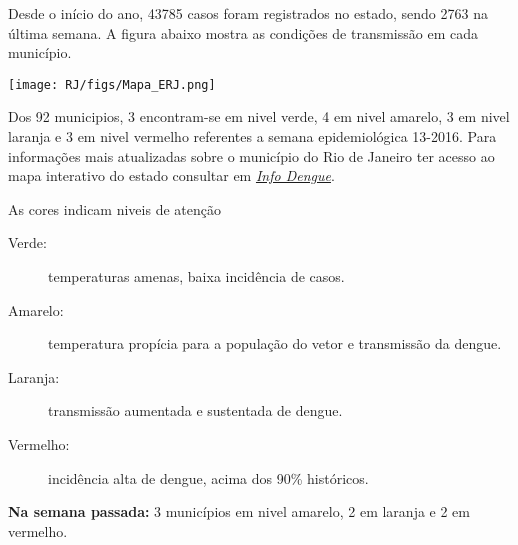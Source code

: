 \documentclass[10pt]{article} %
\begin{document}
\begin{minipage}[t]{.66\linewidth} %

\hypertarget{estado}{} %

Desde o início do ano, 43785 casos foram registrados no estado, sendo 2763 na última semana. A figura abaixo mostra as condições de transmissão em cada município.

\texttt{[image: RJ/figs/Mapa\_ERJ.png]}

Dos 92 municipios, 3 encontram-se em nivel verde, 4 em nivel amarelo, 3 em nivel laranja e 3 em nivel vermelho referentes a semana epidemiológica 13-2016. Para informações mais atualizadas
sobre o município do Rio de Janeiro ter acesso ao mapa interativo do estado consultar em \href{http://info.dengue.mat.br}{\textit{Info Dengue}}.


\vspace{1cm}
\begin{mdframed}[style=intextbox,frametitle={}] %

\hypertarget{descriptivebox}{} %
As cores indicam niveis de atenção
\begin{description}
\item[Verde:] temperaturas amenas, baixa incidência de casos.      
\item[Amarelo:] temperatura propícia para a população do vetor e transmissão da dengue.
\item[Laranja:] transmissão aumentada e sustentada de dengue. 
\item[Vermelho:] incidência alta de dengue, acima dos 90\% históricos.
\end{description}
\end{mdframed}

 \textbf{Na semana passada:} 3 municípios em nivel amarelo, 2 em laranja e 2 em vermelho.    

\end{minipage} %
\end{document}
